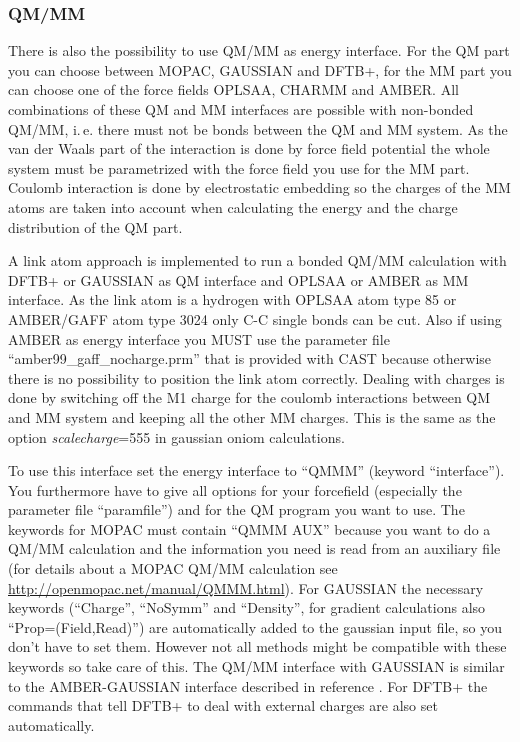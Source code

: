 \documentclass[10pt,a4paper]{article} %
\begin{document}
\subsubsection{QM/MM}

There is also the possibility to use QM/MM as energy interface. For the QM part you can choose between MOPAC, GAUSSIAN and DFTB+, for the MM part you can choose one of the force fields OPLSAA, CHARMM and AMBER. All combinations of these QM and MM interfaces are possible with non-bonded QM/MM, i.\,e. there must not be bonds between the QM and MM system. As the van der Waals part of the interaction is done by force field potential the whole system must be parametrized with the force field you use for the MM part. Coulomb interaction is done by electrostatic embedding so the charges of the MM atoms are taken into account when calculating the energy and the charge distribution of the QM part.

A link atom approach is implemented to run a bonded QM/MM calculation with DFTB+ or GAUSSIAN as QM interface and OPLSAA or AMBER as MM interface. As the link atom is a hydrogen with OPLSAA atom type 85 or AMBER/GAFF atom type 3024 only C-C single bonds can be cut. Also if using AMBER as energy interface you MUST use the parameter file ``amber99\_gaff\_nocharge.prm'' that is provided with CAST because otherwise there is no possibility to position the link atom correctly. Dealing with charges is done by switching off the M1 charge for the coulomb interactions between QM and MM system and keeping all the other MM charges. This is the same as the option \textit{scalecharge}=555 in gaussian oniom calculations.

To use this interface set the energy interface to ``QMMM'' (keyword ``interface''). You furthermore have to give all options for your forcefield (especially the parameter file ``paramfile'') and for the QM program you want to use. The keywords for MOPAC must contain ``QMMM AUX'' because you want to do a QM/MM calculation and the information you need is read from an auxiliary file (for details about a MOPAC QM/MM calculation see \url{http://openmopac.net/manual/QMMM.html}). For GAUSSIAN the necessary keywords (``Charge'', ``NoSymm'' and ``Density'', for gradient calculations also ``Prop=(Field,Read)'') are automatically added to the gaussian input file, so you don't have to set them. However not all methods might be compatible with these keywords so take care of this. The QM/MM interface with GAUSSIAN is similar to the AMBER-GAUSSIAN interface described in reference \cite{okamoto_minimal_2011}. For DFTB+ the commands that tell DFTB+ to deal with external charges are also set automatically.
\end{document}

